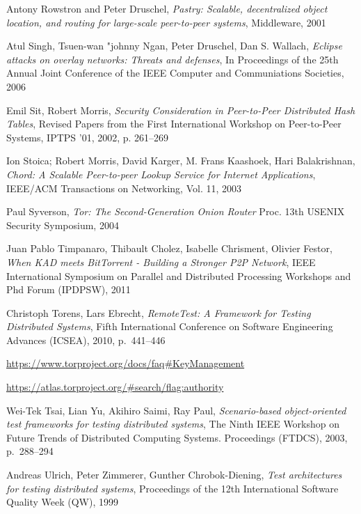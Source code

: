 \begin{thebibliography}{99}
  Antony Rowstron and Peter Druschel,
  \textit{Pastry: Scalable, decentralized object location, and routing for
  large-scale peer-to-peer systems},
  Middleware,
  2001

  Atul Singh, Tsuen-wan "johnny Ngan, Peter Druschel, Dan S. Wallach,
  \textit{Eclipse attacks on overlay networks: Threats and defenses},
  In Proceedings of the 25th Annual Joint Conference of the IEEE Computer and
  Communiations Societies, 2006

  Emil Sit, Robert Morris,
  \textit{Security Consideration in Peer-to-Peer Distributed Hash Tables},
  Revised Papers from the First International Workshop on Peer-to-Peer Systems,
  IPTPS '01, 2002, p. 261--269

  Ion Stoica; Robert Morris, David Karger, M. Frans Kaashoek, Hari Balakrishnan,
  \textit{Chord: A Scalable Peer-to-peer Lookup Service for Internet
  Applications},
  IEEE/ACM Transactions on Networking, Vol. 11, 2003

  Paul Syverson,
  \textit{Tor: The Second-Generation Onion Router}
  Proc. 13th USENIX Security Symposium,
  2004

  Juan Pablo Timpanaro, Thibault Cholez, Isabelle Chrisment, Olivier Festor,
  \textit{When KAD meets BitTorrent - Building a Stronger P2P Network},
  IEEE International Symposium on Parallel and Distributed Processing Workshops
  and Phd Forum (IPDPSW),
  2011

  Christoph Torens, Lars Ebrecht,
  \textit{RemoteTest: A Framework for Testing Distributed Systems},
  Fifth International Conference on Software Engineering Advances (ICSEA),
  2010,
  p.~441--446

  \url{https://www.torproject.org/docs/faq\#KeyManagement}

  \url{https://atlas.torproject.org/\#search/flag:authority}

  Wei-Tek Tsai, Lian Yu, Akihiro Saimi, Ray Paul,
  \textit{Scenario-based object-oriented test frameworks for testing distributed
  systems},
  The Ninth IEEE Workshop on Future Trends of Distributed Computing Systems.
  Proceedings (FTDCS),
  2003,
  p.~{288--294}

  Andreas Ulrich, Peter Zimmerer, Gunther Chrobok-Diening,
  \textit{Test architectures for testing distributed systems},
  Proceedings of the 12th International Software Quality Week (QW),
  1999


\end{thebibliography}
